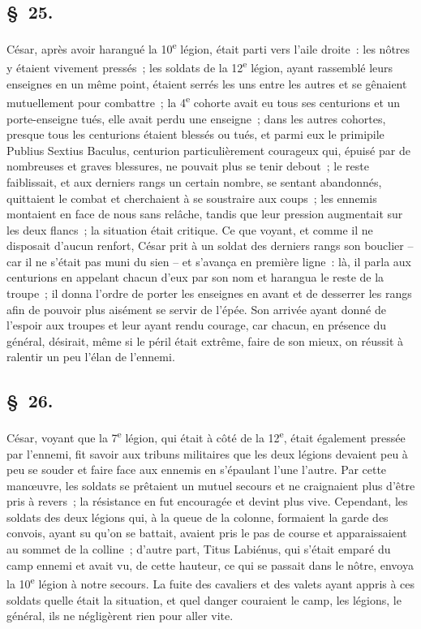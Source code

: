 \documentclass[french,twoside]{book} %
\begin{document}
\subsection[{§ 25.}]{ \textsc{§ 25.} }
\noindent César, après avoir harangué la 10\textsuperscript{e} légion, était parti vers l’aile droite : les nôtres y étaient vivement pressés ; les soldats de la 12\textsuperscript{e} légion, ayant rassemblé leurs enseignes en un même point, étaient serrés les uns entre les autres et se gênaient mutuellement pour combattre ; la 4\textsuperscript{e} cohorte avait eu tous ses centurions et un porte-enseigne tués, elle avait perdu une enseigne ; dans les autres cohortes, presque tous les centurions étaient blessés ou tués, et parmi eux le primipile Publius Sextius Baculus, centurion particulièrement courageux qui, épuisé par de nombreuses et graves blessures, ne pouvait plus se tenir debout ; le reste faiblissait, et aux derniers rangs un certain nombre, se sentant abandonnés, quittaient le combat et cherchaient à se soustraire aux coups ; les ennemis montaient en face de nous sans relâche, tandis que leur pression augmentait sur les deux flancs ; la situation était critique. Ce que voyant, et comme il ne disposait d’aucun renfort, César prit à un soldat des derniers rangs son bouclier – car il ne s’était pas muni du sien – et s’avança en première ligne : là, il parla aux centurions en appelant chacun d’eux par son nom et harangua le reste de la troupe ; il donna l’ordre de porter les enseignes en avant et de desserrer les rangs afin de pouvoir plus aisément se servir de l’épée. Son arrivée ayant donné de l’espoir aux troupes et leur ayant rendu courage, car chacun, en présence du général, désirait, même si le péril était extrême, faire de son mieux, on réussit à ralentir un peu l’élan de l’ennemi.
\subsection[{§ 26.}]{ \textsc{§ 26.} }
\noindent César, voyant que la 7\textsuperscript{e} légion, qui était à côté de la 12\textsuperscript{e}, était également pressée par l’ennemi, fit savoir aux tribuns militaires que les deux légions devaient peu à peu se souder et faire face aux ennemis en s’épaulant l’une l’autre. Par cette manœuvre, les soldats se prêtaient un mutuel secours et ne craignaient plus d’être pris à revers ; la résistance en fut encouragée et devint plus vive. Cependant, les soldats des deux légions qui, à la queue de la colonne, formaient la garde des convois, ayant su qu’on se battait, avaient pris le pas de course et apparaissaient au sommet de la colline ; d’autre part, Titus Labiénus, qui s’était emparé du camp ennemi et avait vu, de cette hauteur, ce qui se passait dans le nôtre, envoya la 10\textsuperscript{e} légion à notre secours. La fuite des cavaliers et des valets ayant appris à ces soldats quelle était la situation, et quel danger couraient le camp, les légions, le général, ils ne négligèrent rien pour aller vite.
\end{document}
